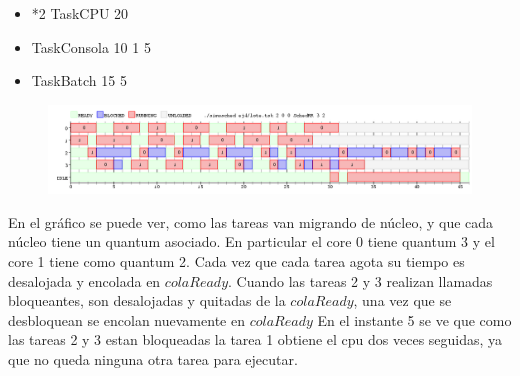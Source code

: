 \begin{itemize}
\item *2 TaskCPU 20
\item TaskConsola 10 1 5
\item TaskBatch 15 5
\end{itemize}


\begin{figure}[h]
  \includegraphics[width=\textwidth]{../ej4/test.png}
\end{figure}


En el gráfico se puede ver, como las tareas van migrando de núcleo, y que cada núcleo tiene un quantum asociado. En particular el core 0 tiene quantum 3 y el 
core 1 tiene como quantum 2. Cada vez que cada tarea agota su tiempo es desalojada y encolada en $colaReady$.
Cuando las tareas 2 y 3 realizan llamadas bloqueantes, son desalojadas y quitadas de la $colaReady$, una vez que se desbloquean se encolan nuevamente en $colaReady$
En el instante 5 se ve que como las tareas 2 y 3 estan bloqueadas la tarea 1 obtiene el cpu dos veces seguidas, ya que no queda ninguna otra tarea para ejecutar.
